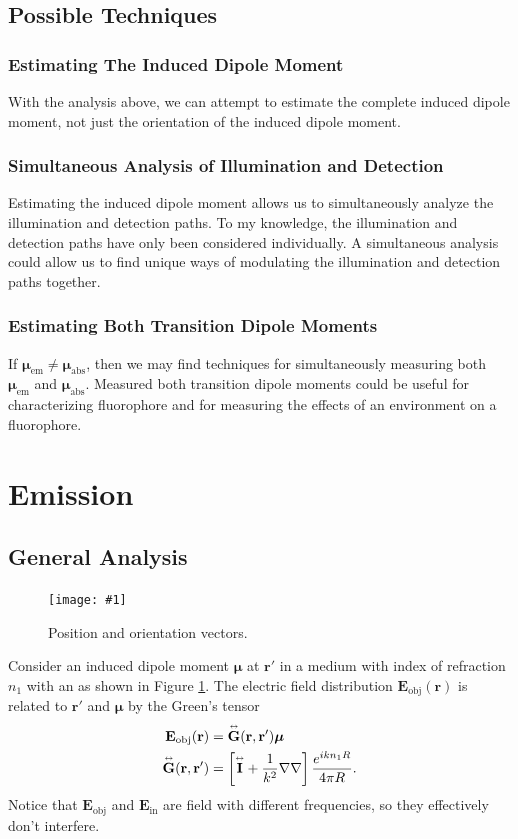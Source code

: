 \documentclass[11pt]{article}
\providecommand{\mb}[1]{\mathbf{#1}}
\providecommand{\bs}[1]{\boldsymbol{#1}}
\providecommand{\fig}[4]{
\begin{figure}[h]
 \captionsetup{width=1.0\linewidth}
 \centering
 \texttt{[image: \#1]}
 \caption{#3}
 \label{fig:#4}
\end{figure}
}
\newcommand{\tensor}[1]{\overset{\text{\tiny$\leftrightarrow$}}{\mb{#1}}}
\begin{document}
\subsection{Possible Techniques}
\subsubsection{Estimating The Induced Dipole Moment}
With the analysis above, we can attempt to estimate the complete induced dipole
moment, not just the orientation of the induced dipole moment. 

\subsubsection{Simultaneous Analysis of Illumination and Detection}
Estimating the induced dipole moment allows us to simultaneously analyze the
illumination and detection paths. To my knowledge, the illumination and
detection paths have only been considered individually. A simultaneous analysis
could allow us to find unique ways of modulating the illumination and detection
paths together.

\subsubsection{Estimating Both Transition Dipole Moments}
If $\bs{\mu}_{\text{em}} \neq\bs{\mu}_{\text{abs}}$, then we may find techniques
for simultaneously measuring both $\bs{\mu}_{\text{em}}$ and
$\bs{\mu}_{\text{abs}}$. Measured both transition dipole moments could be useful
for characterizing fluorophore and for measuring the effects of an environment on
a fluorophore. 

\section{Emission}
\subsection{General Analysis}
\fig{../figures/locations/locations.pdf}{.27}{Position and orientation
  vectors.}{locations} Consider an induced dipole moment $\bs{\mu}$ at
$\mathbf{r}'$ in a medium with index of refraction $n_1$ with an as shown in
Figure \ref{fig:locations}. The electric field distribution $\mathbf{E}_{\text{obj}}(\mb{r})$ is related to $\mathbf{r}'$ and $\bs{\mu}$ by the Green's
tensor \cite{nov}
\begin{align}
  \mb{E}_{\text{obj}}(\mb{r}) &= \tensor{\mb{G}}(\mb{r}, \mb{r'})\bs{\mu}\\
  \tensor{\mb{G}}(\mb{r}, \mb{r'}) &= \left[\tensor{\mb{I}} + \frac{1}{k^2}\nabla\nabla\right]\frac{e^{ikn_1R}}{4\pi R}.
\end{align}
Notice that $\mb{E}_{\text{obj}}$ and $\mb{E}_{\text{in}}$ are field with different
frequencies, so they effectively don't interfere.
\end{document}
